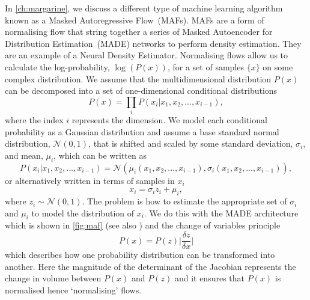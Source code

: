 In \cref{ch:margarine}, we discuss a different type of machine learning algorithm known as a Masked Autoregressive Flow~(MAFs). MAFs are a form of normalising flow that string together a series of Masked Autoencoder for Distribution Estimation~(MADE) \cite{Germain_MADE_2015} networks to perform density estimation. They are an example of a Neural Density Estimator. Normalising flows allow us to calculate the log-probability, $\log(P(x))$, for a set of samples $\{x\}$ on some complex distribution. We assume that the multidimensional distribution $P(x)$ can be decomposed into a set of one-dimensional conditional distributions
\begin{equation}
P(x) = \prod_i P(x_i| x_1, x_2, ..., x_{i-1}),
\end{equation}
where the index $i$ represents the dimension. We model each conditional probability as a Gaussian distribution and assume a base standard normal distribution, $\mathcal{N}(0, 1)$, that is shifted and scaled by some standard deviation, $\sigma_i$, and mean, $\mu_i$, which can be written as
\begin{equation}
P(x_i| x_1, x_2, ..., x_{i-1}) = \mathcal{N}(\mu_i(x_1, x_2, ..., x_{i-1}), \sigma_i(x_1, x_2, ..., x_{i-1})),
\end{equation}
or alternatively written in terms of samples in $x_i$
\begin{equation}
x_i = \sigma_i z_i + \mu_i,
\end{equation}
where $z_i \sim \mathcal{N}(0, 1)$. The problem is how to estimate the appropriate set of $\sigma_i$ and $\mu_i$ to model the distribution of $x_i$. We do this with the MADE architecture which is shown in \cref{fig:maf} (see also \cite{Alsing2019}) and the change of variables principle
\begin{equation}
    P(x) = P(z) \bigg|\frac{\delta z}{\delta x}\bigg|
\end{equation}
which describes how one probability distribution can be transformed into another. Here the magnitude of the determinant of the Jacobian represents the change in volume between $P(x)$ and $P(z)$ and it ensures that $P(x)$ is normalised hence `normalising' flows.

